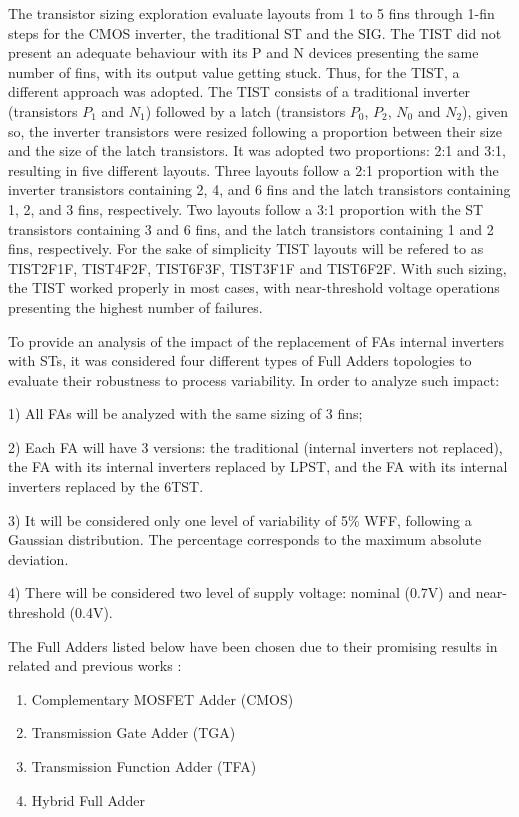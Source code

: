 \documentclass[pgmicro,mestrado,english]{iiufrgs}
\begin{document}
The transistor sizing exploration evaluate layouts from 1 to 5 fins through 1-fin steps for the CMOS inverter, the traditional ST and the SIG. The TIST did not present an adequate behaviour with its P and N devices presenting the same number of fins, with its output value getting stuck. Thus, for the TIST, a different approach was adopted. The TIST consists of a traditional inverter (transistors $P_1$ and $N_1$) followed by a latch (transistors $P_0$, $P_2$, $N_0$ and $N_2$), given so, the inverter transistors were resized following a proportion between their size and the size of the latch transistors. It was adopted two proportions: 2:1 and 3:1, resulting in five different layouts. Three layouts follow a 2:1 proportion with the inverter transistors containing 2, 4, and 6 fins and the latch transistors containing 1, 2, and 3 fins, respectively. Two layouts follow a 3:1 proportion with the ST transistors containing 3 and 6 fins, and the latch transistors containing 1 and 2 fins, respectively. For the sake of simplicity TIST layouts will be refered to as TIST2F1F, TIST4F2F, TIST6F3F, TIST3F1F and TIST6F2F. With such sizing, the TIST worked properly in most cases, with near-threshold voltage operations presenting the highest number of failures.

To provide an analysis of the impact of the replacement of FAs internal inverters with STs, it was considered four different types of Full Adders topologies to evaluate their robustness to process variability. In order to analyze such impact:

1) All FAs will be analyzed with the same sizing of 3 fins;

2) Each FA will have 3 versions: the traditional (internal inverters not replaced), the FA with its internal inverters replaced by LPST, and the FA with its internal inverters replaced by the 6TST.

3) It will be considered only one level of variability of 5\% WFF, following a Gaussian distribution. The percentage corresponds to the maximum absolute deviation.

4) There will be considered two level of supply voltage: nominal (0.7V) and near-threshold (0.4V).

The Full Adders listed below have been chosen due to their promising results in related and previous works \cite{ames2016investigating,dokania2015circuit,dokania2013investigation,moraes2018evaluation}:

\begin{enumerate}
    \item Complementary MOSFET Adder (CMOS)
    \item Transmission Gate Adder (TGA)
    \item Transmission Function Adder (TFA)
    \item Hybrid Full Adder
\end{enumerate}
\end{document}
